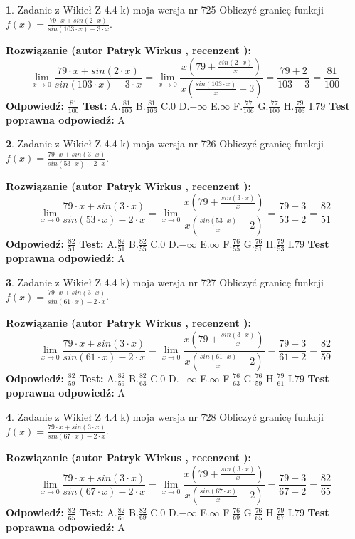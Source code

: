 \documentclass[12pt, a4paper]{article}
\theoremstyle{definition} %
\newtheorem{zad}{}
\newcommand{\zadStart}[1]{\begin{zad}#1\newline}
\newcommand{\zadStop}{\end{zad}}
\newcommand{\rozwStart}[2]{\noindent \textbf{Rozwiązanie (autor #1 , recenzent #2): }\newline}
\newcommand{\rozwStop}{\newline}
\newcommand{\odpStart}{\noindent \textbf{Odpowiedź:}\newline}
\newcommand{\odpStop}{\newline}
\newcommand{\testStart}{\noindent \textbf{Test:}\newline}
\newcommand{\testStop}{\newline}
\newcommand{\kluczStart}{\noindent \textbf{Test poprawna odpowiedź:}\newline}
\newcommand{\kluczStop}{\newline}
\begin{document}
\zadStart{Zadanie z Wikieł Z 4.4 k) moja wersja nr 725}
Obliczyć granicę funkcji $f(x)=\frac{79\cdot x +sin(2\cdot x)}{sin(103\cdot x) -3\cdot x}$.
\zadStop
\rozwStart{Patryk Wirkus}{}
$$\lim\limits_{x\to 0}\frac{79\cdot x +sin(2\cdot x)}{sin(103\cdot x) -3\cdot x}
=\lim\limits_{x\to 0}\frac{x(79+\frac{sin(2\cdot x)}{x})}{x(\frac{sin(103\cdot x)}{x}-3)}
=\frac{79+2}{103-3} = \frac{81}{100}$$
\rozwStop
\odpStart
$\frac{81}{100}$
\odpStop
\testStart
A.$\frac{81}{100}$
B.$\frac{81}{106}$
C.$0$
D.$-\infty$
E.$\infty$
F.$\frac{77}{106}$
G.$\frac{77}{100}$
H.$\frac{79}{103}$
I.$79$
\testStop
\kluczStart
A
\kluczStop



\zadStart{Zadanie z Wikieł Z 4.4 k) moja wersja nr 726}
Obliczyć granicę funkcji $f(x)=\frac{79\cdot x +sin(3\cdot x)}{sin(53\cdot x) -2\cdot x}$.
\zadStop
\rozwStart{Patryk Wirkus}{}
$$\lim\limits_{x\to 0}\frac{79\cdot x +sin(3\cdot x)}{sin(53\cdot x) -2\cdot x}
=\lim\limits_{x\to 0}\frac{x(79+\frac{sin(3\cdot x)}{x})}{x(\frac{sin(53\cdot x)}{x}-2)}
=\frac{79+3}{53-2} = \frac{82}{51}$$
\rozwStop
\odpStart
$\frac{82}{51}$
\odpStop
\testStart
A.$\frac{82}{51}$
B.$\frac{82}{55}$
C.$0$
D.$-\infty$
E.$\infty$
F.$\frac{76}{55}$
G.$\frac{76}{51}$
H.$\frac{79}{53}$
I.$79$
\testStop
\kluczStart
A
\kluczStop



\zadStart{Zadanie z Wikieł Z 4.4 k) moja wersja nr 727}
Obliczyć granicę funkcji $f(x)=\frac{79\cdot x +sin(3\cdot x)}{sin(61\cdot x) -2\cdot x}$.
\zadStop
\rozwStart{Patryk Wirkus}{}
$$\lim\limits_{x\to 0}\frac{79\cdot x +sin(3\cdot x)}{sin(61\cdot x) -2\cdot x}
=\lim\limits_{x\to 0}\frac{x(79+\frac{sin(3\cdot x)}{x})}{x(\frac{sin(61\cdot x)}{x}-2)}
=\frac{79+3}{61-2} = \frac{82}{59}$$
\rozwStop
\odpStart
$\frac{82}{59}$
\odpStop
\testStart
A.$\frac{82}{59}$
B.$\frac{82}{63}$
C.$0$
D.$-\infty$
E.$\infty$
F.$\frac{76}{63}$
G.$\frac{76}{59}$
H.$\frac{79}{61}$
I.$79$
\testStop
\kluczStart
A
\kluczStop



\zadStart{Zadanie z Wikieł Z 4.4 k) moja wersja nr 728}
Obliczyć granicę funkcji $f(x)=\frac{79\cdot x +sin(3\cdot x)}{sin(67\cdot x) -2\cdot x}$.
\zadStop
\rozwStart{Patryk Wirkus}{}
$$\lim\limits_{x\to 0}\frac{79\cdot x +sin(3\cdot x)}{sin(67\cdot x) -2\cdot x}
=\lim\limits_{x\to 0}\frac{x(79+\frac{sin(3\cdot x)}{x})}{x(\frac{sin(67\cdot x)}{x}-2)}
=\frac{79+3}{67-2} = \frac{82}{65}$$
\rozwStop
\odpStart
$\frac{82}{65}$
\odpStop
\testStart
A.$\frac{82}{65}$
B.$\frac{82}{69}$
C.$0$
D.$-\infty$
E.$\infty$
F.$\frac{76}{69}$
G.$\frac{76}{65}$
H.$\frac{79}{67}$
I.$79$
\testStop
\kluczStart
A
\kluczStop
\end{document}
